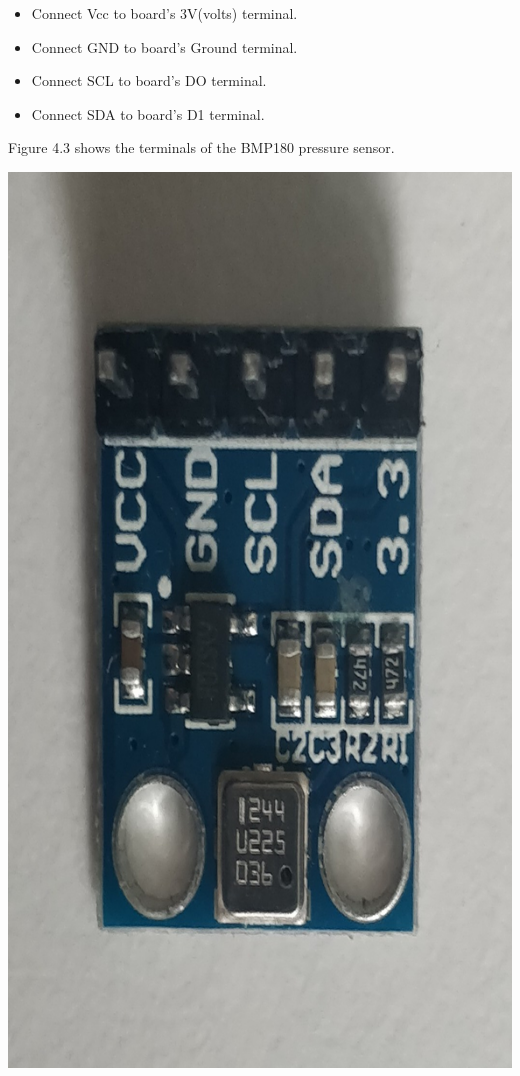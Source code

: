 \documentclass[%
xelatex,
	oneside,		%
	12pt,			%
	parskip=half,	%
	abstracton,
	chapterprefix=true%
    appendixprefix=true]
{scrbook}
\begin{document}
\begin{enumerate}
\begin{itemize}
\item Connect Vcc to board's 3V(volts) terminal.
\item Connect GND to board's Ground terminal.
\item Connect SCL to board's DO terminal.
\item Connect SDA to board's D1 terminal.
\end{itemize}
Figure 4.3 shows the terminals of the BMP180 pressure sensor.				
				\begin{center}
\hspace*{-2cm}\includegraphics[scale=0.03,angle=270]{fig/pressuresensor.jpg}


\end{center}
\end{enumerate}
\end{document}
